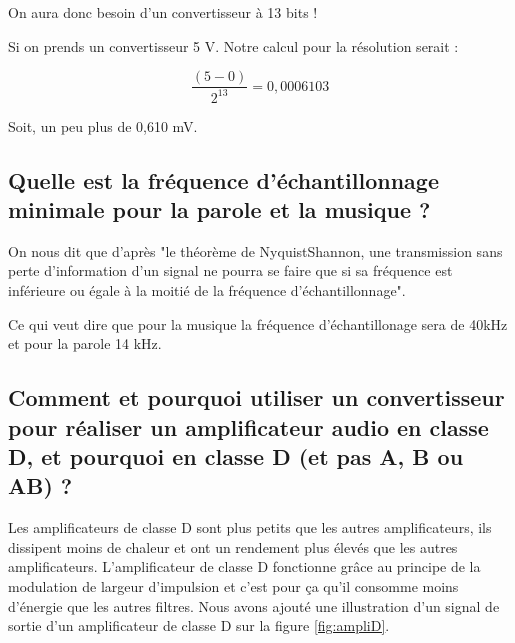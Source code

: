 \documentclass[a4paper]{article}
\begin{document}
On aura donc besoin d'un convertisseur à 13 bits ! 

Si on prends un convertisseur 5 V. Notre calcul pour la résolution serait :

$$ \frac{ (5 - 0) }{ 2^{13} } = 0,0006103 $$

Soit, un peu plus de 0,610 mV.










\subsection{Quelle est la fréquence d’échantillonnage minimale pour la parole et la musique ?}






On nous dit que d'après "le théorème de NyquistShannon, une transmission sans perte d’information d’un signal ne pourra se faire que si sa fréquence est inférieure ou égale à la moitié de la fréquence d’échantillonnage". 

Ce qui veut dire que pour la musique la fréquence d'échantillonage sera de 40kHz et pour la parole 14 kHz.










\subsection{Comment et pourquoi utiliser un convertisseur pour réaliser un amplificateur audio en classe D, et pourquoi en classe D (et pas A, B ou AB) ?}





Les amplificateurs de classe D sont plus petits que les autres amplificateurs, ils dissipent moins de chaleur et ont un rendement plus élevés que les autres amplificateurs. L'amplificateur de classe D fonctionne grâce au principe de la modulation de largeur d'impulsion et c'est pour ça qu'il consomme moins d'énergie que les autres filtres. Nous avons ajouté une illustration d'un signal de sortie d'un amplificateur de classe D sur la figure \ref{fig:ampliD}.
\end{document}

